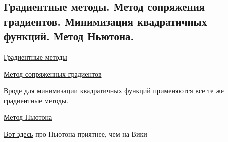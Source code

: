 \subsection{Градиентные методы. Метод сопряжения градиентов. Минимизация квадратичных функций. Метод Ньютона.}

\href{https://ru.wikipedia.org/wiki/%D0%93%D1%80%D0%B0%D0%B4%D0%B8%D0%B5%D0%BD%D1%82%D0%BD%D1%8B%D0%B5_%D0%BC%D0%B5%D1%82%D0%BE%D0%B4%D1%8B}{Градиентные методы}

\href{http://www.machinelearning.ru/wiki/index.php?title=%D0%9C%D0%B5%D1%82%D0%BE%D0%B4_%D1%81%D0%BE%D0%BF%D1%80%D1%8F%D0%B6%D1%91%D0%BD%D0%BD%D1%8B%D1%85_%D0%B3%D1%80%D0%B0%D0%B4%D0%B8%D0%B5%D0%BD%D1%82%D0%BE%D0%B2}{Метод сопряженных градиентов}

Вроде для минимизации квадратичных функций применяются все те же градиентные методы.


\href{https://ru.wikipedia.org/wiki/%D0%9C%D0%B5%D1%82%D0%BE%D0%B4_%D0%9D%D1%8C%D1%8E%D1%82%D0%BE%D0%BD%D0%B0}{Метод Ньютона}

\href{https://ru.algorithmica.org/cs/numerical/newton/}{Вот здесь} про Ньютона приятнее, чем на Вики

